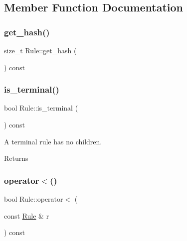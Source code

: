\subsection{Member Function Documentation}
\mbox{\label{class_rule_a62e4d931266a65d4aad9ca3c058d7e25}} 
\subsubsection{\texorpdfstring{get\+\_\+hash()}{get\_hash()}}
{\footnotesize\ttfamily size\+\_\+t Rule\+::get\+\_\+hash (\begin{DoxyParamCaption}{ }\end{DoxyParamCaption}) const\hspace{0.3cm}{\ttfamily [inline]}}

\mbox{\label{class_rule_a9d557e302f94bd85f5505733e8856f97}} 
\subsubsection{\texorpdfstring{is\+\_\+terminal()}{is\_terminal()}}
{\footnotesize\ttfamily bool Rule\+::is\+\_\+terminal (\begin{DoxyParamCaption}{ }\end{DoxyParamCaption}) const\hspace{0.3cm}{\ttfamily [inline]}}

A terminal rule has no children. \begin{DoxyReturn}{Returns}

\end{DoxyReturn}
\mbox{\label{class_rule_a706819fbede2c5a1b0b59f1d28cae30b}} 
\subsubsection{\texorpdfstring{operator$<$()}{operator<()}}
{\footnotesize\ttfamily bool Rule\+::operator$<$ (\begin{DoxyParamCaption}\item[{const \hyperlink{class_rule}{Rule} \&}]{r }\end{DoxyParamCaption}) const\hspace{0.3cm}{\ttfamily [inline]}}

